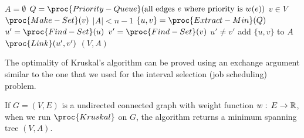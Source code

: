 \begin{codebox}
    \li $A =  \emptyset$
    \li $Q = \proc{Priority-Queue}(\text{all edges $e$ where priority is $w(e)$})$
    \li \For $v \in V$ \Do
        \li $\proc{Make-Set}(v)$
        \End
    \li \While $|A| < n-1$ \Do 
        \li $\{u,v\} = \proc{Extract-Min}(Q)$ 
        \li $u' = \proc{Find-Set}(u)$
        \li $v' = \proc{Find-Set}(v)$
        \li {}
        \li \If $u' \neq v'$  \Then
            \li add $\{u,v\}$ to $A$ 
            \li $\proc{Link}(u',v')$
        \End
    \End
    \li \Return $(V,A)$ 
\end{codebox}

The optimality of Kruskal's algorithm can be proved using an exchange argument similar to the one that we used for the interval selection (job scheduling) problem.

\begin{theorem}
    If $G=(V,E)$ is a undirected connected graph with weight function $w:\,E \to \mathbb{R}$, when we run $\proc{Kruskal}$ on $G$, the algorithm returns a minimum spanning tree $(V,A)$.
\end{theorem}

